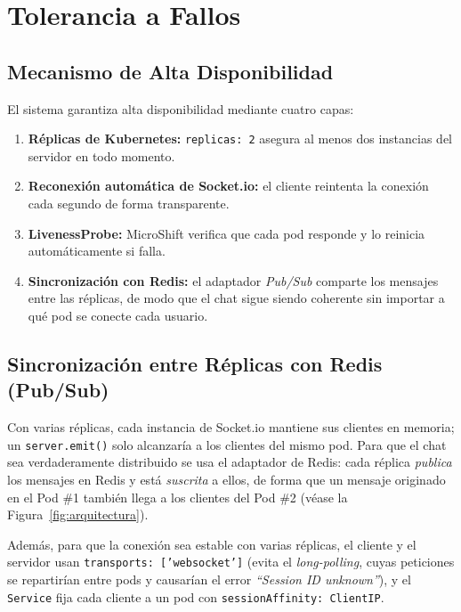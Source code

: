 \documentclass[11pt,a4paper]{article}
\begin{document}
\section{Tolerancia a Fallos}

\subsection{Mecanismo de Alta Disponibilidad}
El sistema garantiza alta disponibilidad mediante cuatro capas:
\begin{enumerate}[leftmargin=1.6em]
  \item \textbf{Réplicas de Kubernetes:} \texttt{replicas: 2} asegura al menos
        dos instancias del servidor en todo momento.
  \item \textbf{Reconexión automática de Socket.io:} el cliente reintenta la
        conexión cada segundo de forma transparente.
  \item \textbf{LivenessProbe:} MicroShift verifica que cada pod responde y lo
        reinicia automáticamente si falla.
  \item \textbf{Sincronización con Redis:} el adaptador \emph{Pub/Sub} comparte
        los mensajes entre las réplicas, de modo que el chat sigue siendo
        coherente sin importar a qué pod se conecte cada usuario.
\end{enumerate}

\subsection{Sincronización entre Réplicas con Redis (Pub/Sub)}
Con varias réplicas, cada instancia de Socket.io mantiene sus clientes en
memoria; un \texttt{server.emit()} solo alcanzaría a los clientes del mismo pod.
Para que el chat sea verdaderamente distribuido se usa el adaptador de Redis:
cada réplica \emph{publica} los mensajes en Redis y está \emph{suscrita} a ellos,
de forma que un mensaje originado en el Pod \#1 también llega a los clientes del
Pod \#2 (véase la Figura~\ref{fig:arquitectura}).

Además, para que la conexión sea estable con varias réplicas, el cliente y el
servidor usan \texttt{transports: ['websocket']} (evita el \emph{long-polling},
cuyas peticiones se repartirían entre pods y causarían el error
\emph{``Session ID unknown''}), y el \texttt{Service} fija cada cliente a un pod
con \texttt{sessionAffinity: ClientIP}.
\end{document}
